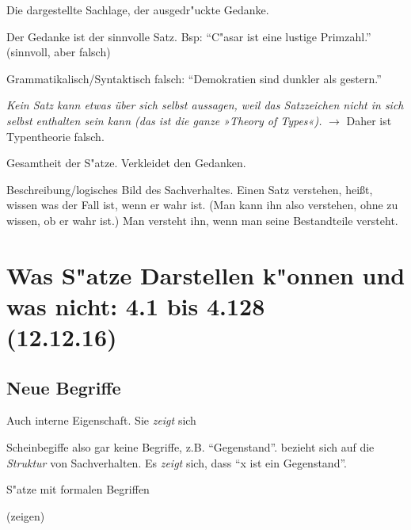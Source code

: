\documentclass[emulatestandardclasses]{scrartcl}
\begin{document}
\begin{description}[leftmargin=!,labelwidth=\widthof{\bfseries Typentheorie}]
  \item[Sinn des Satzes] Die dargestellte Sachlage, der ausgedr"uckte Gedanke.
  \item[Sinnvoll] Der Gedanke ist der sinnvolle Satz. Bsp: "`C"asar ist eine lustige Primzahl."' (sinnvoll, aber falsch)
  \item[Unsinnig] Grammatikalisch/Syntaktisch falsch: "`Demokratien sind dunkler als gestern."'
  \item[Typentheorie] \emph{Kein Satz kann etwas über sich selbst aussagen, weil das Satzzeichen nicht in sich selbst enthalten sein kann (das ist die ganze »Theory of Types«).} $\rightarrow$ Daher ist Typentheorie falsch.
  \item[Sprache] Gesamtheit der S"atze. Verkleidet den Gedanken. 
  \item[Satz] Beschreibung/logisches Bild des Sachverhaltes. Einen Satz verstehen, heißt, wissen was der Fall ist, wenn er wahr ist. (Man kann ihn also verstehen, ohne zu wissen, ob er wahr ist.) Man versteht ihn, wenn man seine Bestandteile versteht.
\end{description}



\section{Was S"atze Darstellen k"onnen und was nicht: 4.1 bis 4.128\\(12.12.16)}

\subsection{Neue Begriffe}

\begin{description}[leftmargin=!,labelwidth=\widthof{\bfseries Sachverhalt}]
  \item[Formale Eigenschaft] Auch interne Eigenschaft. Sie \emph{zeigt} sich
  \item[Formaler Begriff] Scheinbegiffe also gar keine Begriffe, z.B. "`Gegenstand"'. bezieht sich auf die \emph{Struktur} von Sachverhalten. Es \emph{zeigt} sich, dass "`x ist ein Gegenstand"'.
  \item[Unsagbares] S"atze mit formalen Begriffen
  \item[Eigentlicher Begriff] (zeigen) 
\end{description}
\end{document}
